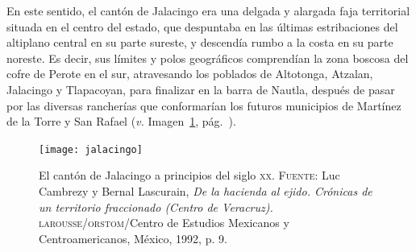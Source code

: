 \documentclass[14pt,twoside,final]{extbook} %
\begin{document}
En este sentido, el cantón de Jalacingo era una delgada y alargada faja territorial situada en el centro del estado, que despuntaba en las últimas estribaciones del altiplano central en su parte sureste, y descendía rumbo a la costa en su parte noreste. Es decir, sus límites y polos geográficos comprendían la zona boscosa del cofre de Perote en el sur, atravesando los poblados de Altotonga, Atzalan, Jalacingo y Tlapacoyan, para finalizar en la barra de Nautla, después de pasar por las diversas rancherías que conformarían los futuros municipios de Martínez de la Torre y San Rafael (\emph{v.} Imagen~\ref{fig:jalacingo-principios-xx}, pág.~\pageref{fig:jalacingo-principios-xx}).
\begin{figure}
\texttt{[image: jalacingo]}
\caption[El cantón de Jalacingo a principios del siglo \textsc{xx}]{El cantón de Jalacingo a principios del siglo \textsc{xx}. \textsc{Fuente:} Luc Cambrezy y Bernal Lascurain, \emph{De la hacienda al ejido. Crónicas de un territorio fraccionado (Centro de Veracruz).} \textsc{larousse/orstom}/Centro de Estudios Mexicanos y Centroamericanos, México, 1992, p. 9.}
\label{fig:jalacingo-principios-xx}
\end{figure}
\end{document}

